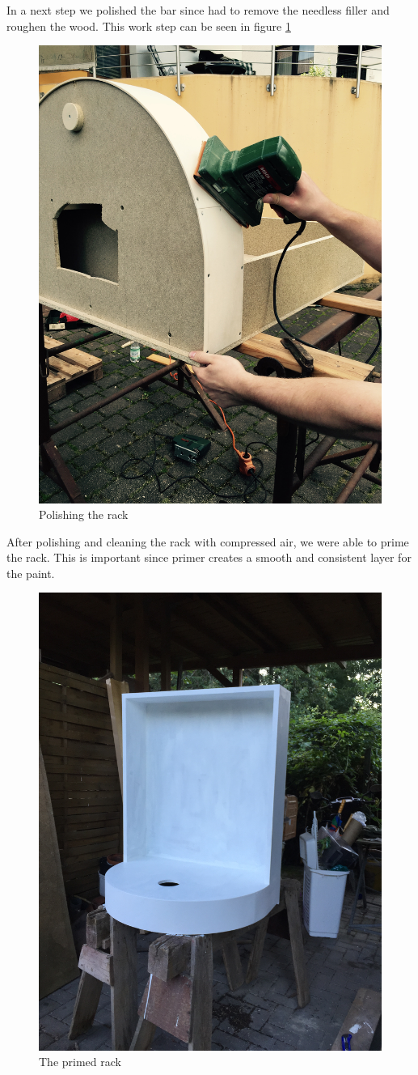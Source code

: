 \documentclass{acm_proc_article-sp}
\begin{document}
In a next step we polished the bar since had to remove the needless filler and roughen the wood. This work step can be seen in figure \ref{fig:polishing}
 
\begin{figure}[htbp] 
  \centering
     \includegraphics[width=0.5\linewidth]{pictures/polishing.jpg}
  \caption{Polishing the rack}
  \label{fig:polishing}
\end{figure}

After polishing and cleaning the rack with compressed air, we were able to prime the rack. This is important since primer creates a smooth and consistent layer for the paint.

\begin{figure}[htbp] 
  \centering
     \includegraphics[width=0.6\linewidth, angle =270]{pictures/rack3.jpg}
  \caption{The primed rack}
  \label{fig:priming}
\end{figure}
\end{document}
